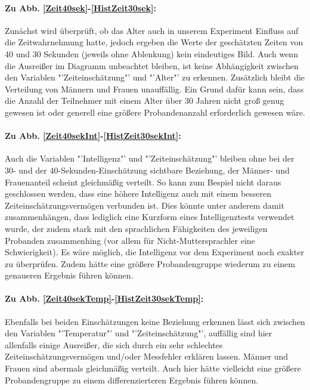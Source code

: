 \documentclass{Paper}
\begin{document}
\paragraph{Zu Abb. \ref{Zeit40sek}-\ref{HistZeit30sek}:}
Zunächst wird überprüft, ob das Alter auch in unserem Experiment Einfluss auf die Zeitwahrnehmung hatte, jedoch ergeben die Werte der geschätzten Zeiten von 40 und 30 Sekunden (jeweils ohne Ablenkung) kein eindeutiges Bild. Auch wenn die Ausreißer im Diagramm unbeachtet bleiben, ist keine Abhängigkeit zwischen den Variablen "'Zeiteinschätzung"' und "'Alter"' zu erkennen. Zusätzlich bleibt die Verteilung von Männern und Frauen unauffällig. Ein Grund dafür kann sein, dass die Anzahl der Teilnehmer mit einem Alter über 30 Jahren nicht groß genug gewesen ist oder generell eine größere Probandenanzahl erforderlich gewesen wäre.

\paragraph{Zu Abb. \ref{Zeit40sekInt}-\ref{HistZeit30sekInt}:} Auch die Variablen "'Intelligenz"' und "'Zeiteinschätzung"' bleiben ohne bei der 30- und der 40-Sekunden-Einschätzung sichtbare Beziehung, der Männer- und Frauenanteil scheint gleichmäßig verteilt. So kann zum Bespiel nicht daraus geschlossen werden, dass eine höhere Intelligenz auch mit einem besseren Zeiteinschätzungsvermögen verbunden ist. Dies könnte unter anderem damit zusammenhängen, dass lediglich eine Kurzform eines Intelligenztests verwendet wurde, der zudem stark mit den sprachlichen Fähigkeiten des jeweiligen Probanden zusammenhing (vor allem für Nicht-Muttersprachler eine Schwierigkeit). Es wäre möglich, die Intelligenz vor dem Experiment noch exakter zu überprüfen. Zudem hätte eine größere Probandengruppe wiederum zu einem genaueren Ergebnis führen können.

\paragraph{Zu Abb. \ref{Zeit40sekTemp}-\ref{HistZeit30sekTemp}:} Ebenfalls bei beiden Einschätzungen keine Beziehung erkennen lässt sich zwischen den Variablen "'Temperatur"' und "'Zeiteinschätzung"', auffällig sind hier allenfalls einige Ausreißer, die sich durch ein sehr schlechtes Zeiteinschätzungsvermögen und/oder Messfehler erklären lassen. Männer und Frauen sind abermals gleichmäßig verteilt. Auch hier hätte vielleicht eine größere Probandengruppe zu einem differenzierteren Ergebnis führen können.
\end{document}
